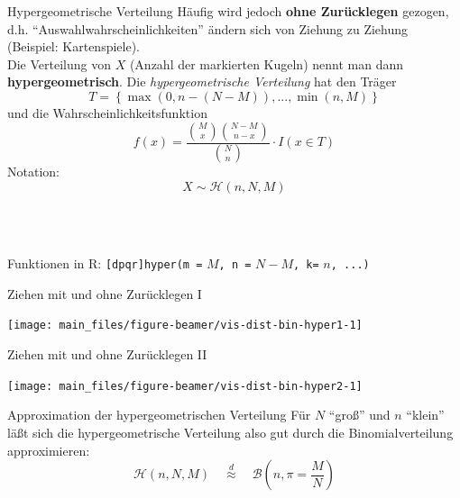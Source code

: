 \documentclass[
  10pt,
  ignorenonframetext,
]{beamer}
\begin{document}
\begin{frame}[fragile]{Hypergeometrische Verteilung}
\label{hypergeometrische-verteilung}
Häufig wird jedoch \textbf{ohne Zurücklegen} gezogen, d.h.
``Auswahlwahrscheinlichkeiten'' ändern sich von Ziehung zu Ziehung
(Beispiel: Kartenspiele).\\

Die Verteilung von \(X\) (Anzahl der markierten Kugeln) nennt man dann
\textbf{hypergeometrisch}. Die \emph{hypergeometrische Verteilung} hat
den Träger \[
{T} = \left\{\max\left(0, n - (N - M)\right), ..., \min\left(n, M\right)\right\}
\] und die Wahrscheinlichkeitsfunktion \[
f(x) = \frac{\binom{M}{x}\binom{N - M}{n - x}}{\binom{N}{n}} \cdot I(x \in T)
\] Notation: \[X \sim {\mathcal H}(n, N, M)\]\\
\strut ~

Funktionen in R: \texttt{{[}dpqr{]}hyper(m\ =} \(M\)\texttt{,\ n\ =}
\(N-M\)\texttt{,\ k=} \(n\)\texttt{,\ ...)}

\end{frame}

\begin{frame}{Ziehen mit und ohne Zurücklegen I}
\label{ziehen-mit-und-ohne-zuruxfccklegen-i}
\scriptsize

\begin{center}\texttt{[image: main\_files/figure-beamer/vis-dist-bin-hyper1-1]} \end{center}

\normalsize
\end{frame}

\begin{frame}{Ziehen mit und ohne Zurücklegen II}
\label{ziehen-mit-und-ohne-zuruxfccklegen-ii}
\scriptsize

\begin{center}\texttt{[image: main\_files/figure-beamer/vis-dist-bin-hyper2-1]} \end{center}

\normalsize
\end{frame}

\begin{frame}{Approximation der hypergeometrischen Verteilung}
\label{approximation-der-hypergeometrischen-verteilung}
Für \(N\) ``groß'' und \(n\) ``klein'' läßt sich die hypergeometrische
Verteilung also gut durch die Binomialverteilung approximieren:\\

\[{\mathcal H}(n, N, M)\quad \stackrel{d}{\approx} \quad {\mathcal B}\left(n, \pi = \frac{M}{N}\right)\]
\end{frame}
\end{document}

